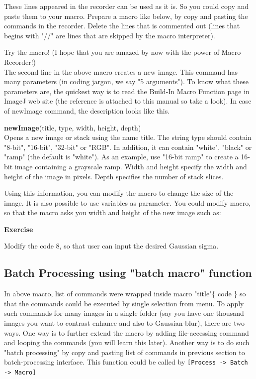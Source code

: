 \documentclass[11pt,a4paper,oneside]{report}
\newenvironment{indentexercise}[1]%
{{\setlength{\leftmargin}{2em}}%
\textbf{Exercise \thesubsection-#1}%
\begin{list}{}%
	\item%
}
{\end{list}}
\newenvironment{indentCom}%
{\begin{list}{}%
         {\setlength{\leftmargin}{1em}}%
         \item[]%
}
{\end{list}}
\newcommand{\ijmenu}[1]{\texttt{\small#1}}
\begin{document}
These lines appeared in the recorder can be used as it is. 
So you could copy and paste them to your macro. 
Prepare a macro like below, by copy and pasting the commands in the recorder. 
Delete the lines that is commented out 
(lines that begins with "//" are lines that are skipped by the macro interpreter).


Try the macro! (I hope that you are amazed by now with the power of Macro Recorder!)\\
 
The second line in the above macro creates a new image. 
This command has many parameters (in coding jargon, we say "5 arguments"). 
To know what these parameters are, 
the quickest way is to read the Build-In Macro Function page in ImageJ web site  
(the reference is attached to this manual so take a look).  
In case of newImage command, the description looks like this. 

\begin{indentCom}
\textbf{newImage}(title, type, width, height, depth)\\
Opens a new image or stack using the name title. 
The string type should contain "8-bit", "16-bit", "32-bit" or "RGB". 
In addition, it can contain "white", "black" or "ramp" (the default is "white"). 
As an example, use "16-bit ramp" to create a 16-bit image containing a grayscale ramp. 
Width and height specify the width and height of the image in pixels. 
Depth specifies the number of stack slices.
\end{indentCom}
Using this information, you can modify the macro to change the size of the image. 
It is also possible to use variables as parameter. 
You could modify macro, so that the macro asks you width and height of the new image such as:


\begin{indentexercise}{1}
Modify the code 8, so that user can input the desired Gaussian sigma.
\end{indentexercise}


\subsection{Batch Processing using "batch macro" function}
In above macro, list of commands were wrapped inside macro "title"\{ code \} 
so that the commands could be executed by single selection from menu. 
To apply such commands for many images in a single folder 
(say you have one-thousand images you want to contrast enhance and also to Gaussian-blur), 
there are two ways. One way is to further extend the macro by adding file-accessing command and 
looping the commands (you will learn this later). 
Another way is to do such "batch processing" by copy and pasting list of commands 
in previous section to batch-processing interface. 
This function could be called by \ijmenu{[Process -> Batch -> Macro]}
\end{document}
